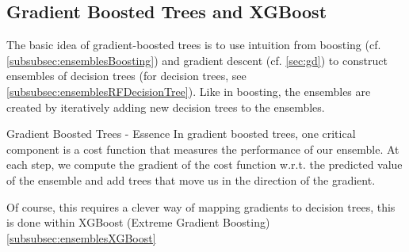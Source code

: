 \subsection{Gradient Boosted Trees and XGBoost}
\label{subsec:ensemblesGBoostedTreesandXGBoost}
The basic idea of gradient-boosted trees is to use intuition from boosting (cf. \ref{subsubsec:ensemblesBoosting}) and gradient descent (cf. \ref{sec:gd}) to construct ensembles of decision trees (for decision trees, see \ref{subsubsec:ensemblesRFDecisionTree}). Like in boosting, the ensembles are created by iteratively adding new decision trees to the ensembles. 
\begin{mybox}{Gradient Boosted Trees - Essence}
In gradient boosted trees, one critical component is a cost function that measures the performance of our ensemble. At each step, we compute the gradient of the cost function w.r.t. the predicted value of the ensemble and add trees that move us in the direction of the gradient. 
\end{mybox}
Of course, this requires a clever way of mapping gradients to decision trees, this is done within XGBoost (Extreme Gradient Boosting) \ref{subsubsec:ensemblesXGBoost}
